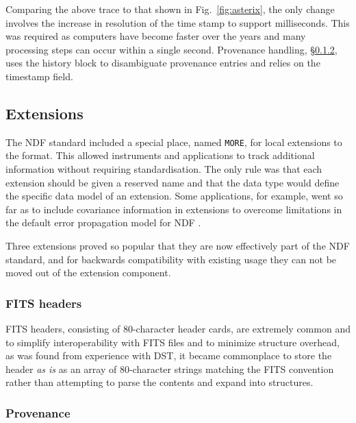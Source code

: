 \documentclass[final,authoryear,5p,times,twocolumn]{elsarticle}
\begin{document}
Comparing the above trace to that shown in Fig.~\ref{fig:asterix},
the only change involves the increase in resolution of the time
stamp to support milliseconds. This was required as computers have
become faster over the years and many processing steps can occur
within a single second. Provenance handling, \S\ref{sec:provenance},
uses the history block to disambiguate provenance entries and relies
on the timestamp field.

\subsection{Extensions}

The NDF standard included a special place, named \texttt{MORE}, for local extensions to the
format. This allowed instruments and applications to track additional
information without requiring standardisation. The only rule was that
each extension should be given a reserved name and that the data type
would define the specific data model of an extension. Some
applications, for example, went so far as to include covariance
information in extensions to overcome limitations in the default error
propagation model for NDF \citep[for example \specdre;][]{SUN140}.

Three extensions proved so popular that they are now effectively part of the NDF
standard, and for backwards compatibility with existing usage they can
not be moved out of the extension component.

\subsubsection{FITS headers}

FITS headers, consisting of 80-character header cards, are extremely
common and to simplify interoperability with FITS files and to
minimize structure overhead, as was found from experience with DST,
it became commonplace to store the header \emph{as is}
as an array of 80-character strings matching the FITS
convention rather than attempting to parse the contents and expand
into structures.

\subsubsection{Provenance}
\label{sec:provenance}
\end{document}
